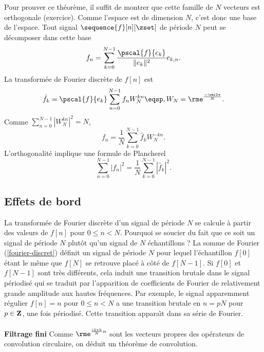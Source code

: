 Pour prouver ce th\'eor\`eme, il suffit de montrer que
cette famille de $N$ vecteurs est orthogonale (exercice).
Comme l'espace est
de dimension $N$, c'est donc une base de l'espace.
Tout signal $\sequence{f}[n][\zset]$ de p\'eriode $N$ peut se d\'ecomposer
dans cette base
\begin{equation}
f_n = \sum_{k=0} ^{N-1} \frac {\pscal{f}{e_k}} {\|e_k \|^2}
e_{k,n} .
\end{equation}
La transform\'ee de Fourier discr\`ete de $f[n]$ est
\begin{equation}
\label{fourier-discret}
\hat{f}_k  = \pscal{f}{e_k}
\sum_{n=0}^{N-1} f_n W_N^{kn}    \eqsp, W_N = \rme^{\frac {-\rmi 2 \pi }{N} } .
\end{equation}
Comme $\sum_{n=0}^{N-1} |W_N^{kn}|^2 = N$,
\begin{equation}
\label{fourier-discret-inverse}
f_n = \frac 1 N \sum_{k=0}^{N-1} \hat f_k W_N^{-kn} .
\end{equation}
L'orthogonalit\'e implique une formule de Plancherel
\begin{equation}
\label{planch-discret}
\sum_{n=0} ^{N-1} |f_n|^2 = \frac{1}{N} \sum_{k=0} ^{N-1} |\hat{f}_k|^2 .
\end{equation}
\subsection{Effets de bord}
La transform\'ee de Fourier discr\`ete
d'un signal de p\'eriode $N$ se calcule \`a partir des
valeurs de $f[n]$ pour $0 \leq n < N$. Pourquoi se soucier
du fait que ce soit un signal de p\'eriode $N$ plut\^ot qu'un signal
de $N$ \'echantillons ?
La somme de Fourier (\ref{fourier-discret})
d\'efinit un signal de p\'eriode $N$ pour lequel l'\'echantillon
$f[0]$ \'etant le m\^eme que $f[N]$ se retrouve
plac\'e \`a c\^ot\'e de $f[N-1]$.
Si $f[0]$ et $f[N-1]$ sont tr\`es diff\'erents, cela induit une
transition brutale dans le signal p\'eriodis\'e qui se traduit
par l'apparition de coefficients de Fourier de relativement
grande amplitude aux hautes fr\'equences.
Par exemple, le signal apparemment r\'egulier
$f[n] = n$ pour $0 \leq n < N$
a une transition brutale en $n=pN$ pour $p \in {\bf{Z}}$,
une fois p\'eriodis\'e. Cette transition appara\^{\i}t
dans sa s\'erie de Fourier.
\\
\\
{\bf Filtrage fini}
Comme $\rme^{ \frac {i2 \pi k} N n  }$ sont les
vecteurs propres des op\'erateurs de convolution
circulaire, on d\'eduit un th\'eor\`eme de convolution.

